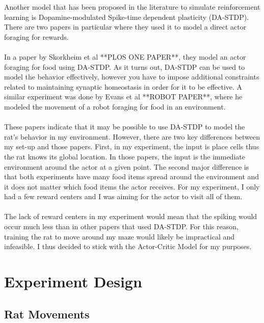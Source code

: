 \documentclass[conference]{IEEEtran}
\begin{document}
Another model that has been proposed in the literature to simulate reinforcement learning is Dopamine-modulated Spike-time dependent plasticity (DA-STDP). There are two papers in particular where they used it to model a direct actor foraging for rewards. \\
\\
In a paper by Skorkheim et al **PLOS ONE PAPER**, they model an actor foraging for food using DA-STDP. As it turns out, DA-STDP can be used to model the behavior effectively, however you have to impose additional constraints related to maintaining synaptic homeostasis in order for it to be effective. A similar experiment was done by Evans et al **ROBOT PAPER**, where he modeled the movement of a robot foraging for food in an environment. \\
\\
These papers indicate that it may be possible to use DA-STDP to model the rat's behavior in my environment. However, there are two key differences between my set-up and those papers. First, in my experiment, the input is place cells thus the rat knows its global location. In those papers, the input is the immediate environment around the actor at a given point. The second major difference is that both experiments have many food items spread around the environment and it does not matter which food items the actor receives. For my experiment, I only had a few reward centers and I was aiming for the actor to visit all of them. \\
\\
The lack of reward centers in my experiment would mean that the spiking would occur much less than in other papers that used DA-STDP. For this reason, training the rat to move around my maze would likely be impractical and infeasible. I thus decided to stick with the Actor-Critic Model for my purposes. 



\section{Experiment Design}

\subsection{Rat Movements}
\end{document}

